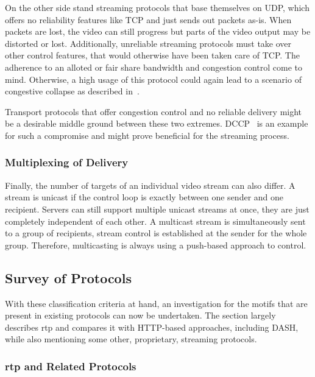 On the other side stand streaming protocols that base themselves on \gls{UDP}, which offers no reliability features like \gls{TCP} and just sends out packets as-is. When packets are lost, the video can still progress but parts of the video output may be distorted or lost. Additionally, unreliable streaming protocols must take over other control features, that would otherwise have been taken care of \gls{TCP}. The adherence to an alloted or fair share bandwidth and congestion control come to mind. Otherwise, a high usage of this protocol could again lead to a scenario of congestive collapse as described in~\cite{rfc896}.

Transport protocols that offer congestion control and no reliable delivery might be a desirable middle ground between these two extremes. \gls{DCCP}~\cite{kohler2006designing} is an example for such a compromise and might prove beneficial for the streaming process.


\subsubsection{Multiplexing of Delivery}
Finally, the number of targets of an individual video stream can also differ. A stream is unicast if the control loop is exactly between one sender and one recipient. Servers can still support multiple unicast streams at once, they are just completely independent of each other. A multicast stream is simultaneously sent to a group of recipients, stream control is established at the sender for the whole group. Therefore, multicasting is always using a push-based approach to control.


\subsection{Survey of Protocols}

With these classification criteria at hand, an investigation for the motifs that are present in existing protocols can now be undertaken. The section largely describes \gls{rtp} and compares it with \gls{HTTP}-based approaches, including \gls{DASH}, while also mentioning some other, proprietary, streaming protocols.


\subsubsection{\texorpdfstring{\acrshort{rtp}}{rtp} and Related Protocols}

